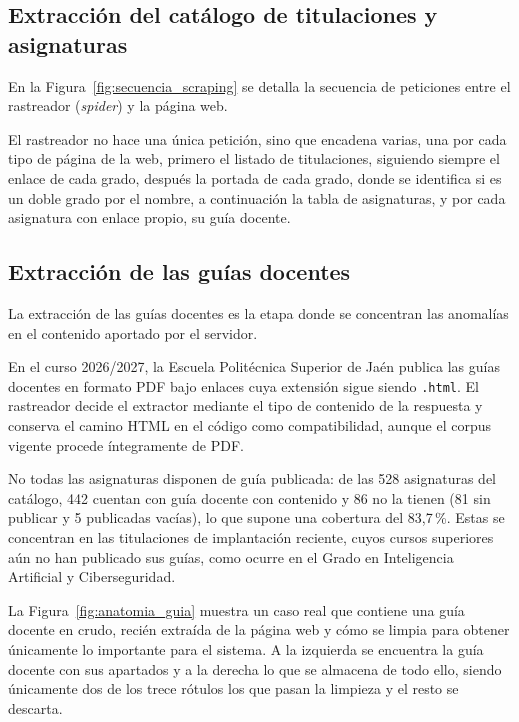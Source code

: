 \subsection{Extracción del catálogo de titulaciones y asignaturas}


En la Figura~\ref{fig:secuencia_scraping} se detalla la secuencia de peticiones entre el
rastreador (\textit{spider}) y la página web.

El rastreador no hace una única petición, sino que encadena varias, una por cada tipo de página de la web, primero el listado de titulaciones, siguiendo siempre el enlace de cada grado, después la portada de cada grado, donde se identifica si es un doble grado por el nombre, a continuación la tabla de asignaturas, y por cada asignatura con enlace propio, su guía docente.




\subsection{Extracción de las guías docentes}

La extracción de las guías docentes es la etapa donde se concentran las anomalías en el contenido aportado por el servidor.

En el curso 2026/2027, la Escuela Politécnica Superior de Jaén publica las guías docentes en formato PDF bajo enlaces cuya extensión sigue siendo \texttt{.html}. El rastreador decide el extractor mediante el tipo de contenido de la respuesta y conserva el camino HTML en el código como compatibilidad, aunque el corpus vigente procede íntegramente de PDF.

No todas las asignaturas disponen de guía publicada: de las 528 asignaturas del catálogo, 442 cuentan con guía docente con
  contenido y 86 no la tienen (81 sin publicar y 5 publicadas vacías), lo que supone una cobertura del 83,7\,\%.
Estas se concentran en las titulaciones de implantación reciente, cuyos cursos superiores aún no
han publicado sus guías, como ocurre en el Grado en Inteligencia Artificial y Ciberseguridad.

La Figura~\ref{fig:anatomia_guia} muestra un caso real que contiene una guía docente en crudo, recién extraída de la página web y cómo se limpia para obtener únicamente lo importante para el sistema. A la izquierda se encuentra la guía docente con sus apartados y a la derecha lo que se almacena de todo ello, siendo únicamente dos de los trece rótulos los que pasan la limpieza y el resto se descarta.

